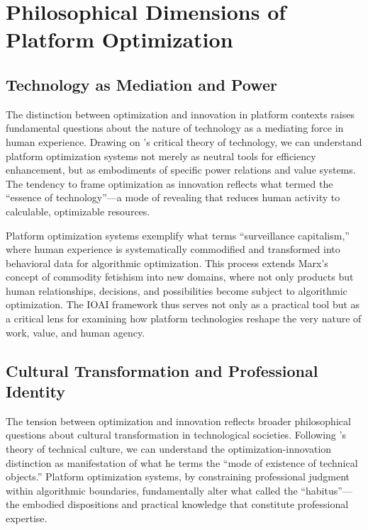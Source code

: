 \appendix
\section{Philosophical Dimensions of Platform Optimization}

\subsection{Technology as Mediation and Power}
The distinction between optimization and innovation in platform contexts raises fundamental questions about the nature of technology as a mediating force in human experience. Drawing on \textcite{feenberg2019}'s critical theory of technology, we can understand platform optimization systems not merely as neutral tools for efficiency enhancement, but as embodiments of specific power relations and value systems. The tendency to frame optimization as innovation reflects what \textcite{heidegger1977} termed the ``essence of technology''---a mode of revealing that reduces human activity to calculable, optimizable resources.

Platform optimization systems exemplify what \textcite{zuboff2019} terms ``surveillance capitalism,'' where human experience is systematically commodified and transformed into behavioral data for algorithmic optimization. This process extends Marx's concept of commodity fetishism into new domains, where not only products but human relationships, decisions, and possibilities become subject to algorithmic optimization. The IOAI framework thus serves not only as a practical tool but as a critical lens for examining how platform technologies reshape the very nature of work, value, and human agency.

\subsection{Cultural Transformation and Professional Identity}
The tension between optimization and innovation reflects broader philosophical questions about cultural transformation in technological societies. Following \textcite{simondon2017}'s theory of technical culture, we can understand the optimization-innovation distinction as manifestation of what he terms the ``mode of existence of technical objects.'' Platform optimization systems, by constraining professional judgment within algorithmic boundaries, fundamentally alter what \textcite{bourdieu1977} called the ``habitus''---the embodied dispositions and practical knowledge that constitute professional expertise.

